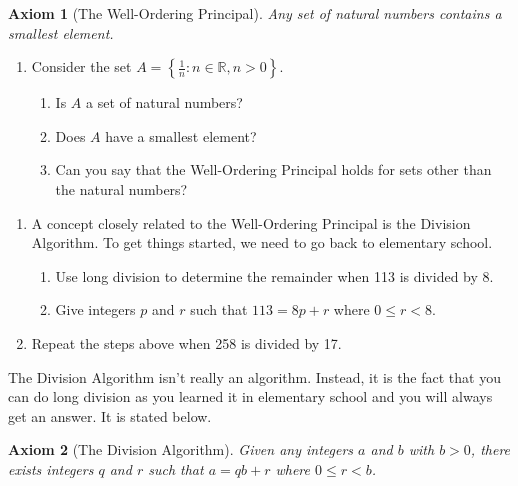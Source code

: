 \documentclass[12 pt]{article}
\newcommand{\R}{\mathbb{R}}
\newcommand{\set}[1]{\left\{#1\right\}}
\theoremstyle{definition}
\theoremstyle{plain}
\theoremstyle{mytheorem}
\theoremstyle{myexample}
\theoremstyle{mydefinition}
\newtheorem{axiom}{Axiom}[]
\begin{document}
\begin{axiom}[The Well-Ordering Principal]	Any set of natural numbers contains a smallest element.
\end{axiom}
	\begin{enumerate}[resume]
	\item Consider the set $A=\set{\frac{1}{n} : n\in \R, n > 0}$.  
		\begin{enumerate}[label=(\roman*)]
		\item Is $A$ a set of natural numbers?  
		\vspace{.5in}
		\item Does $A$ have a smallest element?  
		\vspace{.5in}
		\item Can you say that the Well-Ordering Principal holds for sets other than the natural numbers?
	\vspace{1in}
	\end{enumerate}
	\end{enumerate}
	


	\begin{enumerate}[resume]
	\item A concept closely related to the Well-Ordering Principal is the Division Algorithm.  To get things started, we need to go back to elementary school.
	\begin{enumerate}[label=(\roman*)]
		\item Use long division to determine the remainder when 113 is divided by 8.
		
		\vspace{2in}
		
		\item Give integers $p$ and $r$ such that $113=8p+r$ where $0 \leq r<8$.
		
		\vspace{1.5in}
		
	\end{enumerate}
	\item Repeat the steps above when 258 is divided by 17.
	\vspace{2in}
	
	\end{enumerate}
	
The Division Algorithm isn't really an algorithm.  Instead, it is the fact that you can do long division as you learned it in elementary school and you will always get an answer.  It is stated below.

\begin{axiom}[The Division Algorithm]  Given any integers $a$ and $b$ with $b>0$, there exists integers $q$ and $r$ such that $a=qb+r$ where $0 \leq r < b$.
\end{axiom}
\end{document}
